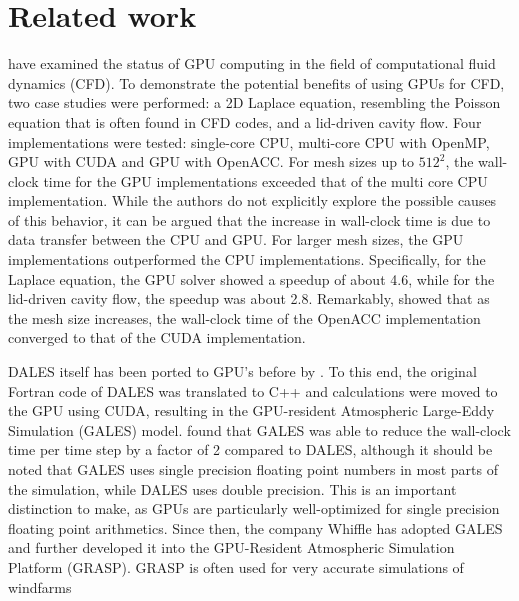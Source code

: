 \section{Related work}

\citet{niemeyerRecentProgressChallenges2014} have examined the status of GPU computing in the field of computational fluid dynamics (CFD). To demonstrate the potential benefits of using GPUs for CFD, two case studies were performed: a 2D Laplace equation, resembling the Poisson equation that is often found in CFD codes, and a lid-driven cavity flow. Four implementations were tested: single-core CPU, multi-core CPU with OpenMP, GPU with CUDA and GPU with OpenACC. For mesh sizes up to $512^2$, the wall-clock time for the GPU implementations exceeded that of the multi core CPU implementation. While the authors do not explicitly explore the possible causes of this behavior, it can be argued that the increase in wall-clock time is due to data transfer between the CPU and GPU. For larger mesh sizes, the GPU implementations outperformed the CPU implementations. Specifically, for the Laplace equation, the GPU solver showed a speedup of about 4.6, while for the lid-driven cavity flow, the speedup was about 2.8. Remarkably, \citet{niemeyerRecentProgressChallenges2014} showed that as the mesh size increases, the wall-clock time of the OpenACC implementation converged to that of the CUDA implementation.

DALES itself has been ported to GPU's before by \citet{schalkwijkHighPerformanceSimulationsTurbulent2012}. To this end, the original Fortran code of DALES was translated to C++ and calculations were moved to the GPU using CUDA, resulting in the GPU-resident Atmospheric Large-Eddy Simulation (GALES) model. \citet{schalkwijkHighPerformanceSimulationsTurbulent2012} found that GALES was able to reduce the wall-clock time per time step by a factor of 2 compared to DALES, although it should be noted that GALES uses single precision floating point numbers in most parts of the simulation, while DALES uses double precision. This is an important distinction to make, as GPUs are particularly well-optimized for single precision floating point arithmetics. Since then, the company Whiffle has adopted GALES and further developed it into the GPU-Resident Atmospheric Simulation Platform (GRASP). GRASP is often used for very accurate simulations of windfarms

